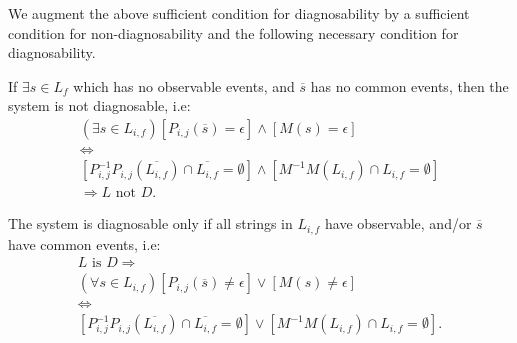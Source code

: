 \documentclass[a4paper, 10pt, conference]{ieeeconf}
\begin{document}

We augment the above sufficient condition for diagnosability by a sufficient
condition for non-diagnosability and the following necessary condition for
diagnosability.
 \begin{conjecture}
If $\exists s \in L_f$ which has no observable events, and $\overline{s}$ has no
common events, then the system is not diagnosable, i.e:
\begin{equation}
\begin{array}{l}
	(\exists s \in L_{i,f}) 
	\left[
		P_{i,j}(\overline{s}) = \epsilon
	\right]
		\land
	\left[
		M(s) = \epsilon
	\right]
	\\[1ex]
	\Leftrightarrow
	\\[1ex]
	\left[
		P^{-1}_{i,j}P_{i,j}(\overline{L_{i,f}})\cap \overline{L_{i,f}} = \emptyset
	\right]
		\land
	\left[
		M^{-1}M(L_{i,f})\cap L_{i,f} = \emptyset
	\right]
	\\[2ex]
	\Rightarrow L \textrm{ not }D.
\end{array}
\end{equation}
\end{conjecture}

\begin{corollary} The system is
diagnosable only if all strings in $L_{i,f}$ have observable, and/or
$\overline{s}$ have common events, i.e:
\label{col_necessary}
\begin{equation}
\begin{array}{l}
	L \textrm{ is }D \Rightarrow 
	\\[2ex]
	(\forall s \in L_{i,f}) 
	\left[
		P_{i,j}(\overline{s}) \neq \epsilon
	\right]
		\lor 
	\left[
		M(s) \neq \epsilon 
	\right]
	\\[1ex]
	\Leftrightarrow
	\\[1ex]
	\left[
	P^{-1}_{i,j}P_{i,j}(\overline{L_{i,f}})\cap \overline{L_{i,f}} = \emptyset 
	\right]
		\lor
	\left[
		M^{-1}M(L_{i,f})\cap L_{i,f} = \emptyset
	\right]. 
\end{array}
\end{equation}
\end{corollary}
\end{document}
